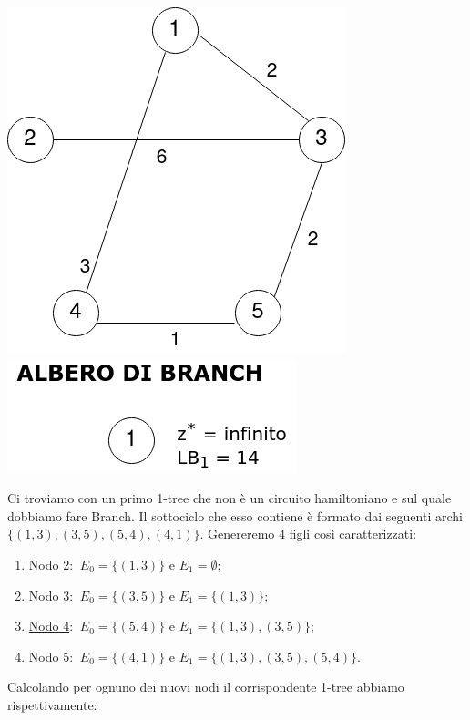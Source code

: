 \documentclass[
	article,			%
	12pt,				%
	oneside,			%
	a4paper,			%
	english,			%
	italian,				%
	sumario=tradicional,
	]{abntex2}
\begin{document}
\begin{center}
    \includegraphics[scale=0.33]{files/primo1Tree.png}
    \qquad \qquad \qquad
    \includegraphics[scale=0.4]{files/alberoBranch1.png}
\end{center}
Ci troviamo con un primo 1-tree che non è un circuito hamiltoniano e sul quale dobbiamo fare Branch. Il sottociclo che esso contiene è formato dai seguenti archi $\{(1,3),(3,5),(5,4),(4,1)\}$. Genereremo 4 figli così caratterizzati:
\begin{enumerate}
    \item [] \underline{Nodo 2}: $\:E_0 = \{(1,3)\}$ e $E_1 = \emptyset$;
    \item [] \underline{Nodo 3}: $\:E_0 = \{(3,5)\}$ e $E_1 = \{(1,3)\}$;
    \item [] \underline{Nodo 4}: $\:E_0 = \{(5,4)\}$ e $E_1 = \{(1,3),(3,5)\}$;
    \item [] \underline{Nodo 5}: $\:E_0 = \{(4,1)\}$ e $E_1 = \{(1,3),(3,5),(5,4)\}$.
\end{enumerate}
\newpage
Calcolando per ognuno dei nuovi nodi il corrispondente 1-tree abbiamo rispettivamente:
\end{document}
